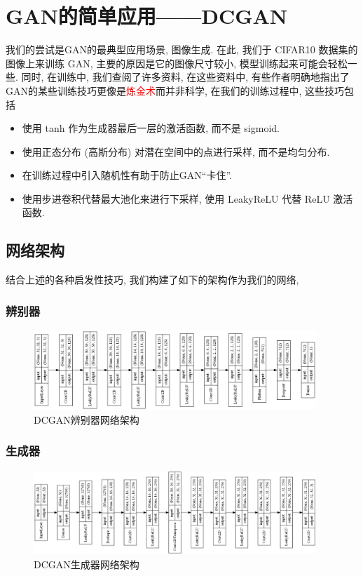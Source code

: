 \documentclass[lang=cn,11pt]{elegantpaper}
\begin{document}
\section{GAN的简单应用——DCGAN}

我们的尝试是GAN的最典型应用场景, 图像生成. 在此, 我们于 CIFAR10 数据集的图像上来训练 GAN, 主要的原因是它的图像尺寸较小, 模型训练起来可能会轻松一些. 同时, 在训练中, 我们查阅了许多资料, 在这些资料中, 有些作者明确地指出了GAN的某些训练技巧更像是\textcolor{red}{炼金术}而并非科学, 在我们的训练过程中, 这些技巧包括
\begin{itemize}
  \item 使用 tanh 作为生成器最后一层的激活函数, 而不是 sigmoid.
  \item 使用正态分布 (高斯分布) 对潜在空间中的点进行采样, 而不是均匀分布. 
  \item 在训练过程中引入随机性有助于防止GAN“卡住”.
  \item 使用步进卷积代替最大池化来进行下采样, 使用 LeakyReLU 代替 ReLU 激活函数. 
\end{itemize}

\subsection{网络架构}

结合上述的各种启发性技巧, 我们构建了如下的架构作为我们的网络,

\subsubsection*{辨别器}

\begin{figure}[hbt]
\centering
  \includegraphics[width=0.95\textwidth]{Arche_D}
  \caption{DCGAN辨别器网络架构}
\end{figure}


\subsubsection*{生成器}

\begin{figure}[hbt]
\centering
  \includegraphics[width=0.95\textwidth]{Arche_G}
  \caption{DCGAN生成器网络架构}
\end{figure}
\end{document}

